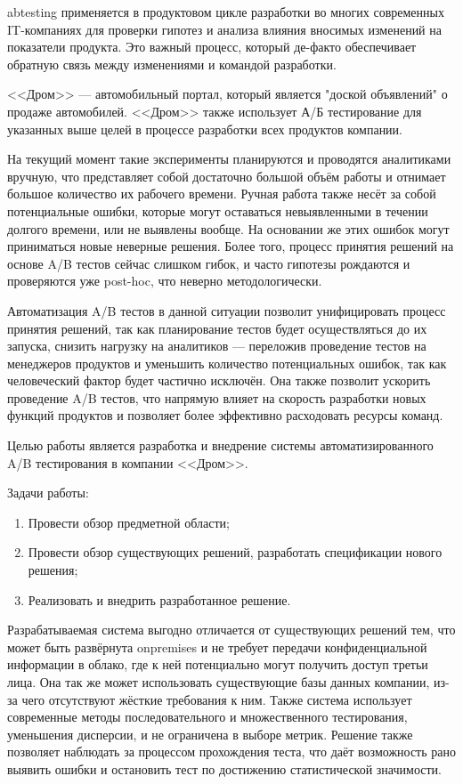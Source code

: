 \documentclass[../document.tex]{subfiles}
\begin{document}
	\par\gls{abtesting} применяется в продуктовом цикле разработки во многих современных IT-компаниях для проверки гипотез и анализа влияния вносимых изменений на показатели продукта. Это важный процесс, который де-факто обеспечивает обратную связь между изменениями и командой разработки.
	\par <<Дром>> --- автомобильный портал, который является "доской объявлений" о продаже автомобилей. <<Дром>> также использует А/Б тестирование для указанных выше целей в процессе разработки всех продуктов компании.
	\par На текущий момент такие эксперименты планируются и проводятся аналитиками вручную, что представляет собой достаточно большой объём работы и отнимает большое количество их рабочего времени. Ручная работа также несёт за собой потенциальные ошибки, которые могут оставаться невыявленными в течении долгого времени, или не выявлены вообще. На основании же этих ошибок могут приниматься новые неверные решения. Более того, процесс принятия решений на основе A/B тестов сейчас слишком гибок, и часто гипотезы рождаются и проверяются уже post-hoc, что неверно методологически.
	\par Автоматизация A/B тестов в данной ситуации позволит унифицировать процесс принятия решений, так как планирование тестов будет осуществляться до их запуска, снизить нагрузку на аналитиков --- переложив проведение тестов на менеджеров продуктов и уменьшить количество потенциальных ошибок, так как человеческий фактор будет частично исключён. Она также позволит ускорить проведение A/B тестов, что напрямую влияет на скорость разработки новых функций продуктов и позволяет более эффективно расходовать ресурсы команд.
	\par Целью работы является разработка и внедрение системы автоматизированного A/B тестирования в компании <<Дром>>.
	\par Задачи работы:
	\begin{enumerate}
		\item Провести обзор предметной области;
		\item Провести обзор существующих решений, разработать спецификации нового решения;
		\item Реализовать и внедрить разработанное решение.
	\end{enumerate}
	\par Разрабатываемая система выгодно отличается от существующих решений тем, что может быть развёрнута \gls{onpremises} и не требует передачи конфиденциальной информации в облако, где к ней потенциально могут получить доступ третьи лица. Она так же может использовать существующие базы данных компании, из-за чего отсутствуют жёсткие требования к ним. Также система использует современные методы последовательного и множественного тестирования, уменьшения дисперсии, и не ограничена в выборе метрик. Решение также позволяет наблюдать за процессом прохождения теста, что даёт возможность рано выявить ошибки и остановить тест по достижению статистической значимости.
\end{document}
